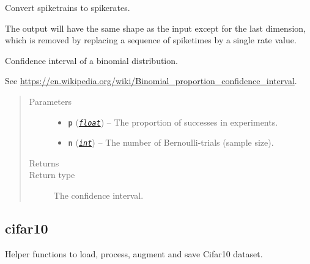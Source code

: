 \documentclass[letterpaper,10pt,english]{sphinxmanual}
\begin{document}
\begin{fulllineitems}
\label{core:core.util.spiketrains_to_rates}
Convert spiketrains to spikerates.

The output will have the same shape as the input except for the last
dimension, which is removed by replacing a sequence of spiketimes by a
single rate value.

\end{fulllineitems}


\begin{fulllineitems}
\label{core:core.util.wilson_score}
Confidence interval of a binomial distribution.

See \url{https://en.wikipedia.org/wiki/Binomial\_proportion\_confidence\_interval}.
\begin{quote}\begin{description}
\item[{Parameters}] \leavevmode\begin{itemize}
\item {} 
\textbf{\texttt{p}} (\href{https://docs.python.org/library/functions.html\#float}{\emph{\texttt{float}}}) -- The proportion of successes in  experiments.

\item {} 
\textbf{\texttt{n}} (\href{https://docs.python.org/library/functions.html\#int}{\emph{\texttt{int}}}) -- The number of Bernoulli-trials (sample size).

\end{itemize}

\item[{Returns}] \leavevmode


\item[{Return type}] \leavevmode
The confidence interval.

\end{description}\end{quote}

\end{fulllineitems}




\subsection{cifar10}
\label{snntoolbox.io_utils:module-snntoolbox.io_utils.cifar10_load}\label{snntoolbox.io_utils:cifar10}\label{snntoolbox.io_utils::doc}
Helper functions to load, process, augment and save Cifar10 dataset.
\end{document}
